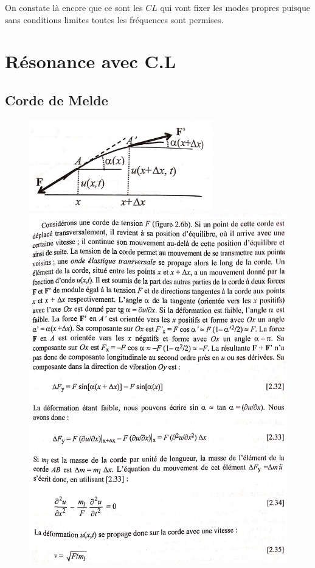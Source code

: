 \documentclass[12pt,prb,aps,epsf]{article}
\begin{document}
On constate là encore que ce sont les $CL$ qui vont fixer les modes propres puisque sans conditions limites toutes les fréquences sont permises.
\section{Résonance avec C.L}
\subsection{Corde de Melde}
\begin{figure}[h!]
	\centering \includegraphics[width=8cm]{corde_schema}
	\centering \includegraphics[width=14.2cm]{corde}
\end{figure}
\end{document}
